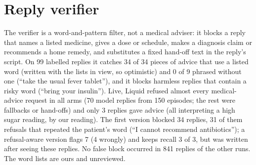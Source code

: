 \documentclass[10pt,a4paper]{article}
\begin{document}
\section{Reply verifier}
The verifier is a word-and-pattern filter, not a medical adviser: it blocks a reply that names a listed medicine, gives a dose or schedule, makes a diagnosis claim or recommends a home remedy, and substitutes a fixed hand-off text in the reply's script. On 99 labelled replies it catches 34 of 34 pieces of advice that use a listed word (written with the lists in view, so optimistic) and 0 of 9 phrased without one (``take the usual fever tablet''), and it blocks harmless replies that contain a risky word (``bring your insulin''). Live, Liquid refused almost every medical-advice request in all arms (70 model replies from 150 episodes; the rest were fallbacks or hand-offs) and only 3 replies gave advice (all interpreting a high sugar reading, by our reading). The first version blocked 34 replies, 31 of them refusals that repeated the patient's word (``I cannot recommend antibiotics''); a refusal-aware version flags 7 (4 wrongly) and keeps recall 3 of 3, but was written after seeing these replies. No false block occurred in 841 replies of the other runs. The word lists are ours and unreviewed.
\end{document}
